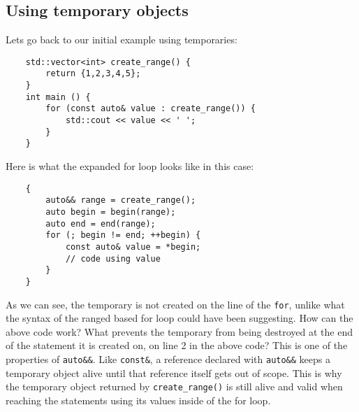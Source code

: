\documentclass{report}
\begin{document}
    \subsection{Using temporary objects}
    Lets go back to our initial example using temporaries:
    \begin{verbatim}
    std::vector<int> create_range() {
        return {1,2,3,4,5};
    } 
    int main () {
        for (const auto& value : create_range()) {
            std::cout << value << ' '; 
        }
    }
    \end{verbatim}
    Here is what the expanded for loop looks like in this case:
    \begin{verbatim}
    {
        auto&& range = create_range(); 
        auto begin = begin(range);
        auto end = end(range);
        for (; begin != end; ++begin) {
            const auto& value = *begin;
            // code using value
        }
    }
    \end{verbatim}
    As we can see, the temporary is not created on the line of the \texttt{for}, unlike what the syntax of the ranged based for loop could have been suggesting.
    \bigbreak \noindent
    How can the above code work? What prevents the temporary from being destroyed at the end of the statement it is created on, on line 2 in the above code?
    \bigbreak \noindent
    This is one of the properties of \texttt{auto\&\&}. Like \texttt{const\&}, a reference declared with \texttt{auto\&\&} keeps a temporary object alive until that reference itself gets out of scope. This is why the temporary object returned by \texttt{create\_range()} is still alive and valid when reaching the statements using its values inside of the for loop.
\end{document}
